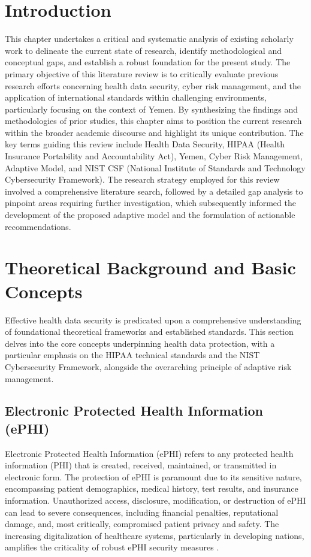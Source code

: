 \documentclass[12pt, a4paper, oneside]{report}
\begin{document}
	\section{Introduction}
	This chapter undertakes a critical and systematic analysis of existing scholarly work to delineate the current state of research, identify methodological and conceptual gaps, and establish a robust foundation for the present study. The primary objective of this literature review is to critically evaluate previous research efforts concerning health data security, cyber risk management, and the application of international standards within challenging environments, particularly focusing on the context of Yemen. By synthesizing the findings and methodologies of prior studies, this chapter aims to position the current research within the broader academic discourse and highlight its unique contribution. The key terms guiding this review include Health Data Security, HIPAA (Health Insurance Portability and Accountability Act), Yemen, Cyber Risk Management, Adaptive Model, and NIST CSF (National Institute of Standards and Technology Cybersecurity Framework). The research strategy employed for this review involved a comprehensive literature search, followed by a detailed gap analysis to pinpoint areas requiring further investigation, which subsequently informed the development of the proposed adaptive model and the formulation of actionable recommendations.
	
	\section{Theoretical Background and Basic Concepts}
	Effective health data security is predicated upon a comprehensive understanding of foundational theoretical frameworks and established standards. This section delves into the core concepts underpinning health data protection, with a particular emphasis on the HIPAA technical standards and the NIST Cybersecurity Framework, alongside the overarching principle of adaptive risk management.
	\subsection{Electronic Protected Health Information (ePHI)}
	Electronic Protected Health Information (ePHI) refers to any protected health information (PHI) that is created, received, maintained, or transmitted in electronic form. The protection of ePHI is paramount due to its sensitive nature, encompassing patient demographics, medical history, test results, and insurance information. Unauthorized access, disclosure, modification, or destruction of ePHI can lead to severe consequences, including financial penalties, reputational damage, and, most critically, compromised patient privacy and safety. The increasing digitalization of healthcare systems, particularly in developing nations, amplifies the criticality of robust ePHI security measures \cite{alhammadi2024advancing}.
\end{document}
